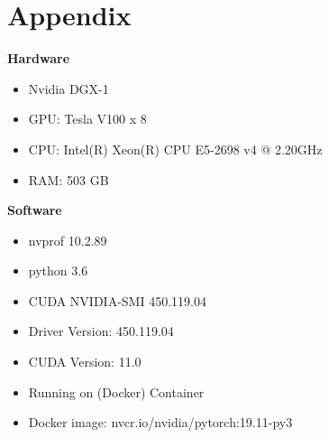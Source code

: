 \section{Appendix} \label{sec:appendix}

\textbf{Hardware}
\begin{itemize}
    \item Nvidia DGX-1
    \item GPU: Tesla V100 x 8
    \item CPU: Intel(R) Xeon(R) CPU E5-2698 v4 @ 2.20GHz
    \item RAM: 503 GB
\end{itemize}

\textbf{Software}
\begin{itemize}
    \item nvprof	10.2.89
    \item python	3.6
    \item CUDA	NVIDIA-SMI 450.119.04  
    \item Driver Version: 450.119.04 
    \item CUDA Version: 11.0
    \item Running on (Docker) Container
    \item Docker image: nvcr.io/nvidia/pytorch:19.11-py3
\end{itemize}



% 

% 